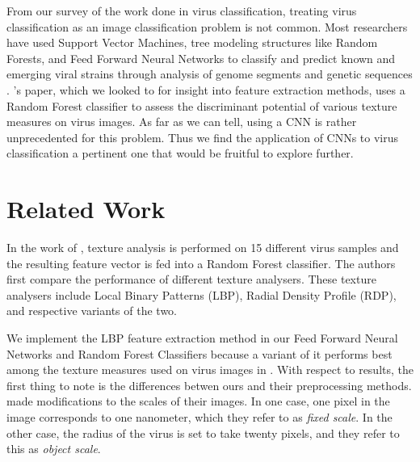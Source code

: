 \begin{multicols}{2}
From our survey of the work done in virus classification, treating virus classification as an image classification problem is not common. Most researchers have used Support Vector Machines, tree modeling structures like Random Forests, and Feed Forward Neural Networks to classify and predict known and emerging viral strains through analysis of genome segments and genetic sequences \citet{work_A} \citet{work_B} \citet{work_C}. \citet{kylberg2011virus}'s paper, which we looked to for insight into feature extraction methods, uses a Random Forest classifier to assess the discriminant potential of various texture measures on virus images. As far as we can tell, using a CNN is rather unprecedented for this problem. Thus we find the application of CNNs to virus classification a pertinent one that would be fruitful to explore further.


\section{Related Work}
\label{text:relwork_results}
In the work of \citet{kylberg2011virus}, texture analysis is performed on 15 different virus samples and the resulting feature vector is fed into a Random Forest classifier. The authors first compare the performance of different texture analysers. These texture analysers include Local Binary Patterns (LBP), Radial Density Profile (RDP), and respective variants of the two.

We implement the LBP feature extraction method in our Feed Forward Neural Networks and Random Forest Classifiers because a variant of it performs best among the texture measures used on virus images in \citet{kylberg2011virus}. With respect to \citet{kylberg2011virus} results, the first thing to note is the differences betwen ours and their preprocessing methods. \citet{kylberg2011virus} made modifications to the scales of their images. In one case, one pixel in the image corresponds to one nanometer, which they refer to as \emph{fixed scale}. In the other case, the radius of the virus is set to take twenty pixels, and they refer to this as \emph{object scale}. 


\end{multicols}
